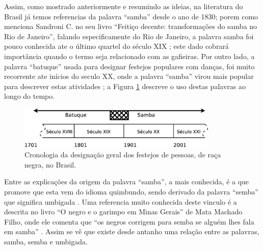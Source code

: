 Assim, como mostrado anteriormente e resumindo as ideias, 
na literatura do Brasil já temos referencias da palavra ``samba'' desde o ano de 1830; 
porem como menciona Sandroni C. no seu livro ``Feitiço decente: transformações do samba no Rio de Janeiro'', 
falando especificamente do Rio de Janeiro, 
a palavra samba foi pouco conhecida ate o último quartel do século XIX \cite[pp. 86]{sandroni2001feitico};
este dado cobrará importância quando o termo seja relacionado com as gafieiras.
Por outro lado, a palavra  ``batuque'' usada para designar festejos populares com danças, foi muito recorrente ate inícios do seculo XX, 
onde a palavra ``samba'' virou mais popular para descrever estas atividades \cite[pp. 85]{sandroni2001feitico} \cite[pp. 47]{diniz2008almanaque}; 
a Figura \ref{fig:sambacrono} descreve o uso destas palavras ao longo do tempo.
\begin{figure}[h]
  \centering
    \includegraphics[width=0.85\textwidth]{chapters/cap-historia/samba-crono.eps}
  \caption{Cronologia da designação geral dos festejos de pessoas, de raça negra, no Brasil.}
  \label{fig:sambacrono}
\end{figure}


Entre as explicações da origem da palavra ``samba'', 
a mais conhecida, é a que promove que esta vem do idioma quimbundo, 
sendo derivado da palavra ``semba''  que significa umbigada \cite[pp. 47]{diniz2008almanaque} \cite[pp. 50]{da2015historia}.
Uma referencia muito conhecida deste vinculo é a descrita no livro ``O negro e o garimpo em Minas Gerais''
de Mata Machado Filho, onde ele comenta que ``os negros corrigem para semba se 
alguém lhes fala em samba'' \cite[pp. 85]{sandroni2001feitico}. Assim se vê que existe
desde antanho uma relação entre as palavras, 
samba, semba e umbigada.

